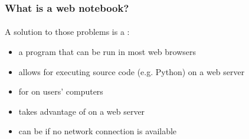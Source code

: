 \documentclass{beamer}
\begin{document}
\begin{frame}
    \frametitle{What is a web notebook?}
    \framesubtitle{}

    A solution to those problems is a :
    \begin{itemize}
        \pause
        \item a program that can be run in most  web browsers
        \pause
        \item allows for executing source code (e.g. Python) on a web server
        \pause
        \item {} for  on users' computers
        \pause
        \item takes advantage of  on a web server
        \pause
        \item can be  if no network connection is available
    \end{itemize}
\end{frame}
\end{document}
